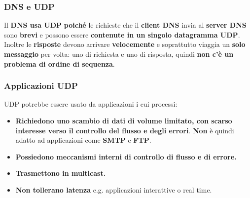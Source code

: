 \documentclass[11pt,a4paper,oneside]{book}
\theoremstyle{definition}
\begin{document}
\subsubsection{DNS e UDP}
Il \textbf{DNS usa UDP} \textbf{poiché} le richieste che il \textbf{client DNS} invia al \textbf{server DNS} sono \textbf{brevi} e possono essere \textbf{contenute in un singolo datagramma UDP}. Inoltre le \textbf{risposte} devono arrivare \textbf{velocemente} e soprattutto viaggia un \textbf{solo messaggio} per volta: uno di richiesta e uno di risposta, quindi \textbf{non c'è un problema di ordine di sequenza}.
\subsubsection{Applicazioni UDP}
UDP potrebbe essere usato da applicazioni i cui processi:
\begin{itemize}
	\item \textbf{Richiedono uno scambio di dati di volume limitato, con scarso interesse verso il controllo del flusso e degli errori}. \textbf{Non} è quindi adatto ad applicazioni come \textbf{SMTP} e \textbf{FTP}.
	\item \textbf{Possiedono meccanismi interni di controllo di flusso e di errore.}
	\item \textbf{Trasmettono in multicast.}
	\item \textbf{Non tollerano latenza} e.g. applicazioni interattive o real time.
\end{itemize}

\pagebreak
\end{document}
